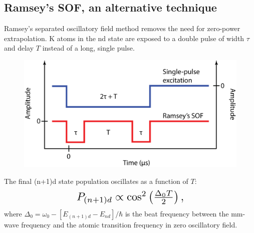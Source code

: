 \documentclass[landscape]{sciposter}
\begin{document}
\begin{multicols}{4}
\section*{\large Ramsey's SOF, an alternative technique}
Ramsey's separated oscillatory field method removes the need for zero-power extrapolation. K atoms in the nd state are exposed to a double pulse of width $\tau$ and delay $T$ instead of a long, single pulse. 

\begin{figure}
\begin{center}
\includegraphics[scale=0.9]{Ramsey_excitation.png}
\end{center}
\end{figure}

The final (n+1)d state population oscillates as a function of $T$: 
\begin{equation*}
\resizebox{0.45\hsize}{!}{$P_{(n+1)d} \propto {\cos}^{2}\left(\frac{\Delta_{0} T}{2}\right),$}
\end{equation*}
where $\Delta_0=\omega_0-[E_{(n+1)d}-E_{nd}]/\hbar$ is the beat frequency between the mm-wave frequency and the atomic transition frequency in zero oscillatory field.
 

\end{multicols}
\end{document}
